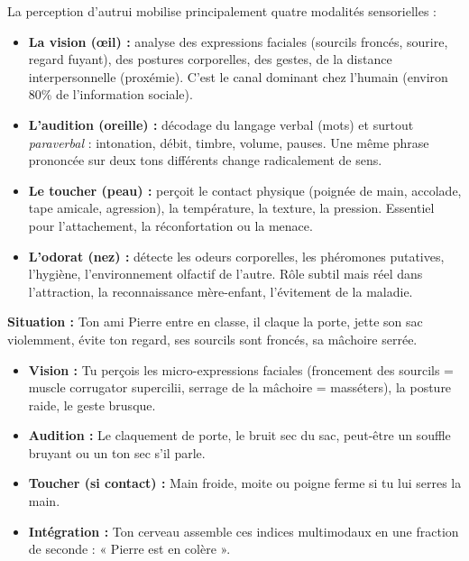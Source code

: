 \documentclass[11pt]{article}
\begin{document}
\begin{propriete}
La perception d'autrui mobilise principalement quatre modalités sensorielles :
\begin{itemize}
    \item \textbf{La vision (œil) :} analyse des expressions faciales (sourcils froncés, sourire, regard fuyant), des postures corporelles, des gestes, de la distance interpersonnelle (proxémie). C'est le canal dominant chez l'humain (environ 80\% de l'information sociale).
    \item \textbf{L'audition (oreille) :} décodage du langage verbal (mots) et surtout \emph{paraverbal} : intonation, débit, timbre, volume, pauses. Une même phrase prononcée sur deux tons différents change radicalement de sens.
    \item \textbf{Le toucher (peau) :} perçoit le contact physique (poignée de main, accolade, tape amicale, agression), la température, la texture, la pression. Essentiel pour l'attachement, la réconfortation ou la menace.
    \item \textbf{L'odorat (nez) :} détecte les odeurs corporelles, les phéromones putatives, l'hygiène, l'environnement olfactif de l'autre. Rôle subtil mais réel dans l'attraction, la reconnaissance mère-enfant, l'évitement de la maladie.
\end{itemize}
\end{propriete}

\begin{exemplebox}
\textbf{Situation :} Ton ami Pierre entre en classe, il claque la porte, jette son sac violemment, évite ton regard, ses sourcils sont froncés, sa mâchoire serrée.
\begin{itemize}
    \item \textbf{Vision :} Tu perçois les micro-expressions faciales (froncement des sourcils = muscle corrugator supercilii, serrage de la mâchoire = masséters), la posture raide, le geste brusque.
    \item \textbf{Audition :} Le claquement de porte, le bruit sec du sac, peut-être un souffle bruyant ou un ton sec s'il parle.
    \item \textbf{Toucher (si contact) :} Main froide, moite ou poigne ferme si tu lui serres la main.
    \item \textbf{Intégration :} Ton cerveau assemble ces indices multimodaux en une fraction de seconde : « Pierre est en colère ».
\end{itemize}
\end{exemplebox}
\end{document}
